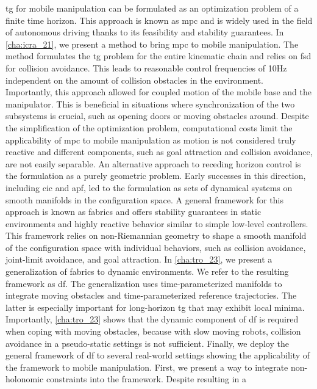\Ac{tg} for mobile manipulation can be formulated as an
optimization problem of a finite time horizon. This approach is known as
\ac{mpc} and is widely used in the field of autonomous driving thanks to its
feasibility and stability guarantees. In \cref{cha:icra_21}, we present a method
to bring \ac{mpc} to mobile manipulation. The method formulates the \ac{tg}
problem for the entire kinematic chain and relies on \ac{fsd} for collision
avoidance. This leads to reasonable control frequencies of 10Hz independent on
the amount of collision obstacles in the environment. Importantly, this approach
allowed for coupled motion of the mobile base and the manipulator. This is
beneficial in situations where synchronization of the two subsystems is crucial,
such as opening doors or moving obstacles around.
Despite the simplification of the optimization problem, computational costs
limit the applicability of \ac{mpc} to mobile manipulation as motion is not
considered truly reactive and different components, such as goal attraction and
collision avoidance, are not easily separable. An alternative approach to
receding horizon control is the formulation as a purely geometric problem.
Early successes in this direction, including \ac{cic} and \ac{apf}, led to the
formulation as sets of dynamical systems on smooth manifolds in the
configuration space. A general framework for this approach is known as
\acf{fabrics} and offers stability guarantees in static environments and highly
reactive behavior similar to simple low-level controllers.
This framework relies on non-Riemannian
geometry to shape a smooth manifold of the configuration space with individual
behaviors, such as collision avoidance, joint-limit avoidance, and goal 
attraction. In \cref{cha:tro_23}, we present a generalization of
\ac{fabrics} to dynamic environments. We refer to the resulting framework as
\ac{df}. The generalization uses time\hyp{}parameterized manifolds to integrate 
moving obstacles and time\hyp{}parameterized reference trajectories. The latter is
especially important for long-horizon \ac{tg} that may exhibit local minima.
Importantly, \cref{cha:tro_23} shows that the dynamic component of \ac{df}
is required when coping with moving obstacles, because with slow moving robots,
collision avoidance in a pseudo-static settings is not sufficient.
Finally, we deploy the general framework of \ac{df} to several real-world
settings showing the applicability of the framework to mobile manipulation.
First, we present a way to
integrate non\hyp{}holonomic constraints into the framework. Despite resulting in a
